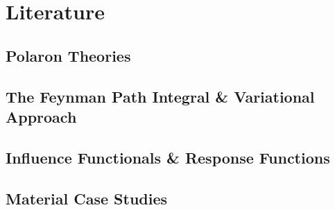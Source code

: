 \chapter{Literature}
\label{chap:second}



\section{Polaron Theories}
\label{sec:chap-second-first}

\section{The Feynman Path Integral \& Variational Approach}
\label{sec:chap-second-second}

\section{Influence Functionals \& Response Functions}
\label{sec:chap-second-third}

\section{Material Case Studies}
\label{sec:chap-second-fourth}